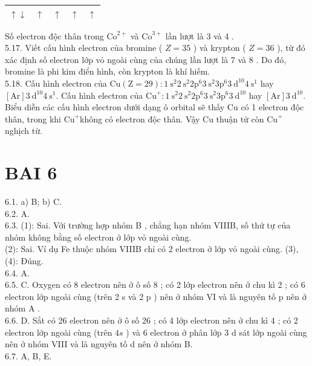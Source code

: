 \documentclass[10pt]{article}
\begin{document}
\begin{center}
\begin{tabular}{|l|l|l|l|l|}
\hline
$\uparrow \downarrow$ & $\uparrow$ & $\uparrow$ & $\uparrow$ & $\uparrow$ \\
\hline
\end{tabular}
\end{center}

Số electron độc thân trong $\mathrm{Co}^{2+}$ và $\mathrm{Co}^{3+}$ lần lượt là 3 và 4 .\\
5.17. Viết cấu hình electron của bromine ( $Z=35$ ) và krypton ( $Z=36$ ), từ đó xác định số electron lớp vỏ ngoài cùng của chúng lần lượt là 7 và 8 . Do đó, bromine là phi kim điển hình, còn krypton là khí hiếm.\\
5.18. Cấu hình electron của $\mathrm{Cu}(\mathrm{Z}=29): 1 \mathrm{~s}^{2} 2 \mathrm{~s}^{2} 2 \mathrm{p}^{6} 3 \mathrm{~s}^{2} 3 \mathrm{p}^{6} 3 \mathrm{~d}^{10} 4 \mathrm{~s}^{1}$ hay $[\mathrm{Ar}] 3 \mathrm{~d}^{10} 4 \mathrm{~s}^{1}$. Cấu hình electron của $\mathrm{Cu}^{+}: 1 \mathrm{~s}^{2} 2 \mathrm{~s}^{2} 2 \mathrm{p}^{6} 3 \mathrm{~s}^{2} 3 \mathrm{p}^{6} 3 \mathrm{~d}^{10}$ hay $[\mathrm{Ar}] 3 \mathrm{~d}^{10}$.\\
Biểu diễn các cấu hình electron dưới dạng ô orbital sẽ thấy Cu có 1 electron độc thân, trong khi $\mathrm{Cu}^{+}$không có electron độc thân. Vậy Cu thuận từ còn $\mathrm{Cu}^{+}$ nghịch từ.

\section*{BAI 6}
6.1. a) B; b) C.\\
6.2. A.\\
6.3. (1): Sai. Với trường hợp nhóm B , chẳng hạn nhóm VIIIB, số thứ tự của nhóm không bằng số electron ở lớp vỏ ngoài cùng.\\
(2): Sai. Ví dụ Fe thuộc nhóm VIIIB chỉ có 2 electron ở lớp vỏ ngoài cùng. (3), (4): Đúng.\\
6.4. A.\\
6.5. C. Oxygen có 8 electron nên ở ô số 8 ; có 2 lớp electron nên ở chu kì 2 ; có 6 electron lớp ngoài cùng (trên 2 s và 2 p ) nên ở nhóm VI và là nguyên tố p nên ở nhóm A .\\
6.6. D. Sắt có 26 electron nên ở ô số 26 ; có 4 lớp electron nên ở chu kì 4 ; có 2 electron lớp ngoài cùng (trên $4 s$ ) và 6 electron ở phân lớp 3 d sát lớp ngoài cùng nên ở nhóm VIII và là nguyên tố d nên ở nhóm B.\\
6.7. A, B, E.
\end{document}
